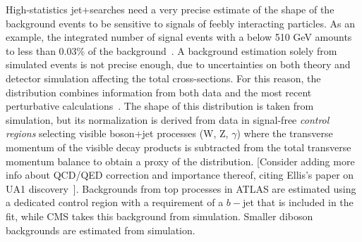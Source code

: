 High-statistics jet+\MET searches need a very precise estimate of the shape of the background events to be sensitive to signals of feebly interacting particles. 
As an example, the integrated number of signal events with a \MET below 510 GeV amounts to less than 0.03\% of the background~\cite{Sirunyan:2017jix}. 
A background estimation solely from simulated events is not precise enough, due to uncertainties on both theory and detector simulation affecting the total cross-sections. 
For this reason, the \MET distribution combines information from both data and the most recent perturbative calculations~\cite{Lindert:2017olm}.
The shape of this distribution is taken from simulation, but its normalization is derived from data in signal-free \textit{control regions} selecting  visible boson+jet processes (W, Z, $\gamma$) 
where the transverse momentum of the visible decay products is subtracted from the total transverse momentum balance to obtain a proxy of the \MET distribution. 
[Consider adding more info about QCD/QED correction and importance thereof, citing Ellis's paper on UA1 discovery~\cite{Ellis:159861}].
Backgrounds from top processes in ATLAS are estimated using a dedicated control region with a requirement of a $b-$jet that is included in the fit, while CMS takes this background from simulation. Smaller diboson backgrounds are estimated from simulation. 

